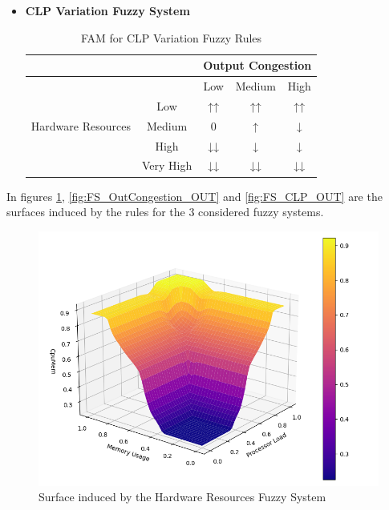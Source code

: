 \begin{itemize}
    \item \textbf{CLP Variation Fuzzy System}
    \begin{table}[!htb]
        \begin{center}
            \begin{tabular}{ |c|c|c|c|c| }
                \hline
                & & \multicolumn{3}{c|}{Output Congestion} \\
                \hline
                \multirow{5}{6em}{Hardware Resources}
                &             & Low   & Medium & High \\
                & Low         & ↑↑    & ↑↑     & ↑↑    \\
                & Medium      & 0     & ↑      & ↓    \\
                & High        & ↓↓    & ↓      & ↓    \\
                & Very High   & ↓↓    & ↓↓     & ↓↓   \\
                \hline
            \end{tabular}
            \caption{FAM for CLP Variation Fuzzy Rules}
            \label{tab:FAM_CLP}
        \end{center}
    \end{table}
\end{itemize}


In figures \ref{fig:FS_CpuMem_OUT}, \ref{fig:FS_OutCongestion_OUT} and \ref{fig:FS_CLP_OUT} are the surfaces induced by the rules for the 3 considered fuzzy systems.

\begin{figure}[!htb]
    \centering

    \includegraphics[width=.6\textwidth]{images/plots/CpuMem3D_better.png}\hfill

    \caption{Surface induced by the Hardware Resources Fuzzy System}
    \label{fig:FS_CpuMem_OUT}
\end{figure}

